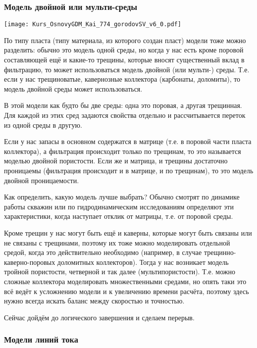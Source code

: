 \documentclass[main.tex]{subfiles}
\begin{document}
\subsubsection{Модель двойной или мульти-среды}

\texttt{[image: Kurs\_OsnovyGDM\_Kai\_774\_gorodovSV\_v6\_0.pdf]}

По типу пласта (типу материала, из которого создан пласт) модели тоже можно разделить: обычно это модель одной среды, но когда у нас есть кроме поровой составляющей ещё и какие-то трещины, которые вносят существенный вклад в фильтрацию, то может использоваться модель двойной (или мульти-) среды.
Т.е. если у нас трещиноватые, кавернозные коллектора (карбонаты, доломиты), то модель двойной среды может использоваться.

В этой модели как будто бы две среды: одна это поровая, а другая трещинная.
Для каждой из этих сред задаются свойства отдельно и рассчитывается переток из одной среды в другую.

Если у нас запасы в основном содержатся в матрице (т.е. в поровой части пласта коллектора), а фильтрация происходит только по трещинам, то это называется моделью двойной пористости.
Если же и матрица, и трещины достаточно проницаемы (фильтрация происходит и в матрице, и по трещинам), то это модель двойной проницаемости.

Как определить, какую модель лучше выбрать? Обычно смотрят по динамике работы скважин или по гидродинамическим исследованиям определяют эти характеристики, когда наступает отклик от матрицы, т.е. от поровой среды.

Кроме трещин у нас могут быть ещё и каверны, которые могут быть связаны или не связаны с трещинами, поэтому их тоже можно моделировать отдельной средой, когда это действительно необходимо (например, в случае трещинно-каверно-поровых доломитных коллекторов).
Тогда у нас возникает модель тройной пористости, четверной и так далее (мультипористости).
Т.е. можно сложные коллектора моделировать множественными средами, но опять таки это всё ведёт к усложнению модели и к увеличению времени расчёта, поэтому здесь нужно всегда искать баланс между скоростью и точностью.

Сейчас дойдём до логического завершения и сделаем перерыв.

\subsubsection{Модели линий тока}
\end{document}
